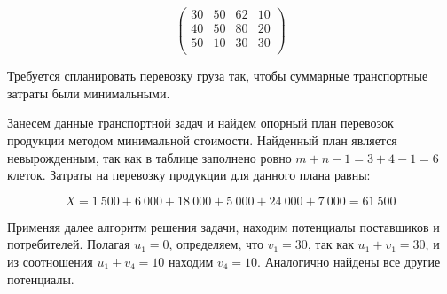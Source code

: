 \documentclass[a4paper,12pt]{article}
\begin{document}
\[
	\begin{pmatrix}
		30 & 50 & 62 & 10 \\
		40 & 50 & 80 & 20 \\
		50 & 10 & 30 & 30 \\
	\end{pmatrix}
\]

Требуется спланировать перевозку груза так, чтобы суммарные транспортные затраты были минимальными.

Занесем данные транспортной задач и найдем опорный план перевозок продукции методом минимальной стоимости. Найденный план является невырожденным, так как в таблице заполнено ровно $m + n - 1 = 3 + 4 - 1 = 6$ клеток. Затраты на перевозку продукции для данного плана равны:

\[
	X = 1 \ 500 + 6 \ 000 + 18 \ 000 + 5 \ 000 + 24 \ 000 + 7 \ 000 = 61 \ 500
\]

Применяя далее алгоритм решения задачи, находим потенциалы поставщиков и потребителей. Полагая $u_1 = 0$, определяем, что $v_1 = 30$, так как $u_1 + v_1 = 30$, и из соотношения $u_1 + v_4 = 10$ находим $v_4 = 10$. Аналогично найдены все другие потенциалы.
\end{document}
